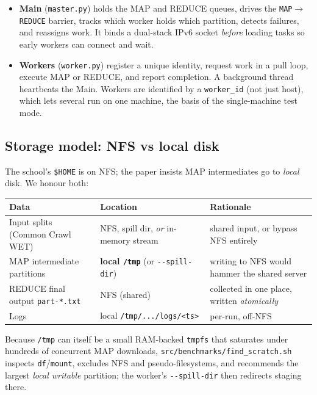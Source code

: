 \documentclass[11pt,a4paper]{article}
\newcommand{\code}[1]{\texttt{\small #1}}
\begin{document}
\begin{itemize}
\item \textbf{Main} (\code{master.py}) holds the MAP and REDUCE queues, drives
the \code{MAP$\to$REDUCE} barrier, tracks which worker holds which partition,
detects failures, and reassigns work. It binds a dual-stack IPv6 socket
\emph{before} loading tasks so early workers can connect and wait.
\item \textbf{Workers} (\code{worker.py}) register a unique identity, request
work in a pull loop, execute MAP or REDUCE, and report completion. A background
thread heartbeats the Main. Workers are identified by a \code{worker\_id} (not
just host), which lets several run on one machine, the basis of the
single-machine test mode.
\end{itemize}

\subsection{Storage model: NFS vs local disk}\label{sec:storage}

The school's \code{\$HOME} is on NFS; the paper insists MAP intermediates go to
\emph{local} disk. We honour both:

\begin{table}[H]
\centering
\small
\renewcommand{\arraystretch}{1.25}
\begin{tabularx}{\textwidth}{@{}llX@{}}
\toprule
\textbf{Data} & \textbf{Location} & \textbf{Rationale}\\
\midrule
Input splits (Common Crawl WET) & NFS, spill dir, \emph{or} in-memory stream & shared input, or bypass NFS entirely\\
MAP intermediate partitions & \textbf{local \code{/tmp}} (or \code{-{}-spill-dir}) & writing to NFS would hammer the shared server\\
REDUCE final output \code{part-*.txt} & NFS (shared) & collected in one place, written \emph{atomically}\\
Logs & local \code{/tmp/.../logs/<ts>} & per-run, off-NFS\\
\bottomrule
\end{tabularx}
\end{table}

Because \code{/tmp} can itself be a small RAM-backed \code{tmpfs} that saturates
under hundreds of concurrent MAP downloads, \code{src/benchmarks/find\_scratch.sh}
inspects \code{df}/\code{mount}, excludes NFS and pseudo-filesystems, and
recommends the largest \emph{local writable} partition; the worker's
\code{-{}-spill-dir} then redirects staging there.
\end{document}

